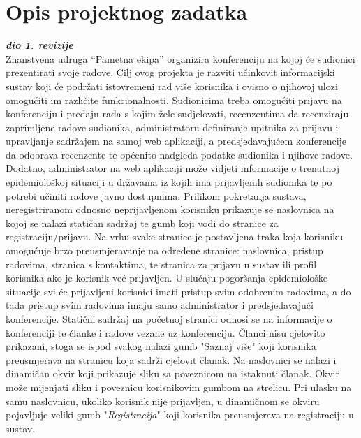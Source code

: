 \chapter{Opis projektnog zadatka}
		
		\textbf{\textit{dio 1. revizije}}\\

		Znanstvena udruga “Pametna ekipa” organizira konferenciju na kojoj će sudionici prezentirati svoje radove. Cilj ovog projekta je razviti učinkovit informacijski sustav koji će podržati istovremeni rad više korisnika i ovisno o njihovoj ulozi omogućiti im različite funkcionalnosti. Sudionicima treba omogućiti prijavu na konferenciju i predaju rada s kojim žele sudjelovati, recenzentima da recenziraju zaprimljene radove sudionika, administratoru definiranje upitnika za prijavu i upravljanje sadržajem na samoj web aplikaciji, a predsjedavajućem konferencije da odobrava recenzente te općenito nadgleda podatke sudionika i njihove radove. Dodatno, administrator na web aplikaciji može vidjeti informacije o trenutnoj epidemiološkoj situaciji u državama iz kojih ima prijavljenih sudionika te po potrebi učiniti radove javno dostupnima.
		\newline
		\newline
		Prilikom pokretanja sustava, neregistriranom odnosno neprijavljenom korisniku prikazuje se naslovnica na kojoj se nalazi statičan sadržaj te gumb koji vodi do stranice za registraciju/prijavu. Na vrhu svake stranice  je postavljena traka koja korisniku omogućuje brzo preusmjeravanje na određene stranice: naslovnica, pristup radovima, stranica s kontaktima, te stranica za prijavu u sustav ili profil korisnika ako je korisnik već prijavljen. U slučaju pogoršanja epidemiološke situacije svi će prijavljeni korisnici imati pristup svim odobrenim radovima, a do tada pristup svim radovima imaju samo administrator i predsjedavajući konferencije. Statični sadržaj na početnoj stranici odnosi se na informacije o konferenciji te članke i radove vezane uz konferenciju. Članci nisu cjelovito prikazani, stoga se ispod svakog nalazi gumb "Saznaj više" koji korisnika preusmjerava na stranicu koja sadrži cjelovit članak. Na naslovnici se nalazi i dinamičan okvir koji prikazuje sliku sa poveznicom na istaknuti članak. Okvir može mijenjati sliku i poveznicu korisnikovim gumbom na strelicu. Pri ulasku na samu naslovnicu, ukoliko korisnik nije prijavljen, u dinamičnom se okviru pojavljuje veliki gumb "\textit{Registracija}" koji korisnika preusmjerava na registraciju u sustav. 
		\newline

